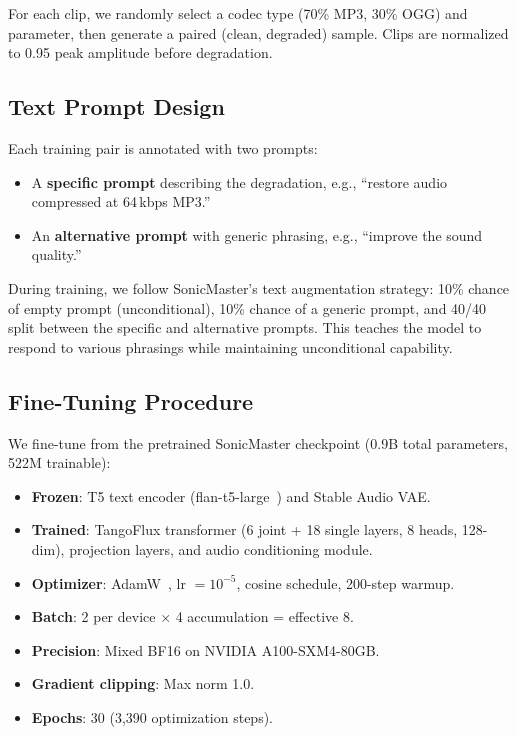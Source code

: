 \documentclass[conference]{IEEEtran}
\begin{document}
For each clip, we randomly select a codec type (70\% MP3, 30\% OGG) and
parameter, then generate a paired (clean, degraded) sample. Clips are
normalized to 0.95 peak amplitude before degradation.

\subsection{Text Prompt Design}
Each training pair is annotated with two prompts:
\begin{itemize}
    \item A \textbf{specific prompt} describing the degradation, e.g.,
    ``restore audio compressed at 64\,kbps MP3.''
    \item An \textbf{alternative prompt} with generic phrasing, e.g.,
    ``improve the sound quality.''
\end{itemize}

During training, we follow SonicMaster's text augmentation strategy: 10\%
chance of empty prompt (unconditional), 10\% chance of a generic prompt, and
40/40 split between the specific and alternative prompts. This teaches the
model to respond to various phrasings while maintaining unconditional
capability.

\subsection{Fine-Tuning Procedure}
\begin{sloppypar}
We fine-tune from the pretrained SonicMaster checkpoint (0.9B total
parameters, 522M trainable):
\begin{itemize}
    \item \textbf{Frozen}: T5 text encoder (flan-t5-large~\cite{raffel2020t5})
    and Stable Audio VAE.
    \item \textbf{Trained}: TangoFlux transformer (6 joint + 18 single layers,
    8 heads, 128-dim), projection layers, and audio conditioning module.
    \item \textbf{Optimizer}: AdamW~\cite{loshchilov2019adamw}, lr $= 10^{-5}$,
    cosine schedule, 200-step warmup.
    \item \textbf{Batch}: 2 per device $\times$ 4 accumulation = effective 8.
    \item \textbf{Precision}: Mixed BF16 on NVIDIA A100-SXM4-80GB.
    \item \textbf{Gradient clipping}: Max norm 1.0.
    \item \textbf{Epochs}: 30 (3{,}390 optimization steps).
\end{itemize}
\end{sloppypar}
\end{document}
